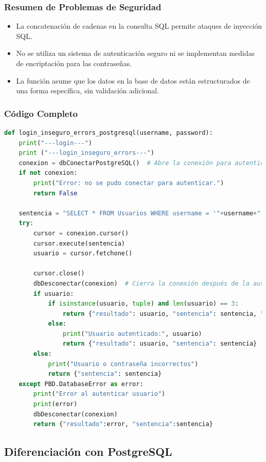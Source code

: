 \documentclass[a4paper,12pt]{article}
\begin{document}
\subsubsection{Resumen de Problemas de Seguridad}
\begin{itemize}
    \item La concatenación de cadenas en la consulta SQL permite ataques de inyección SQL.
    \item No se utiliza un sistema de autenticación seguro ni se implementan medidas de encriptación para las contraseñas.
    \item La función asume que los datos en la base de datos están estructurados de una forma específica, sin validación adicional.
\end{itemize}

\subsubsection{Código Completo}
\begin{lstlisting}[language=Python]
def login_inseguro_errors_postgresql(username, password):
    print("---login---")
    print ("---login_inseguro_errors---")
    conexion = dbConectarPostgreSQL()  # Abre la conexión para autenticación
    if not conexion:
        print("Error: no se pudo conectar para autenticar.")
        return False

    sentencia = "SELECT * FROM Usuarios WHERE username = '"+username+"' AND password = '"+password+"'"
    try:
        cursor = conexion.cursor()
        cursor.execute(sentencia)
        usuario = cursor.fetchone()

        cursor.close()
        dbDesconectar(conexion)  # Cierra la conexión después de la autenticación
        if usuario:
            if isinstance(usuario, tuple) and len(usuario) == 3:
                return {"resultado": usuario, "sentencia": sentencia, "auth": "true"}
            else:
                print("Usuario autenticado:", usuario)
                return {"resultado": usuario, "sentencia": sentencia}
        else:
            print("Usuario o contraseña incorrectos")
            return {"sentencia": sentencia}
    except PBD.DatabaseError as error:
        print("Error al autenticar usuario")
        print(error)
        dbDesconectar(conexion)
        return {"resultado":error, "sentencia":sentencia}
\end{lstlisting}

\subsection{Diferenciación con PostgreSQL}
\end{document}
